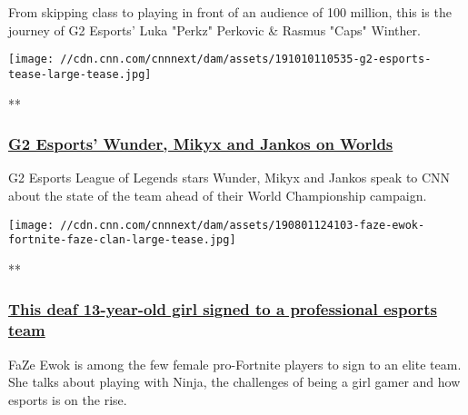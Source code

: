 From skipping class to playing in front of an audience of 100 million,
this is the journey of G2 Esports' Luka "Perkz" Perkovic \& Rasmus
"Caps" Winther.

\href{/videos/sports/2019/10/10/g2-esports-league-of-legends-world-championship-wunder-jankos-mikyx-preview-spt-intl-lon-orig.cnn}{}

\texttt{[image: //cdn.cnn.com/cnnnext/dam/assets/191010110535-g2-esports-tease-large-tease.jpg]}

**

\hypertarget{g2-esports-wunder-mikyx-and-jankos-on-worlds}{%
\subsubsection{\texorpdfstring{\href{/videos/sports/2019/10/10/g2-esports-league-of-legends-world-championship-wunder-jankos-mikyx-preview-spt-intl-lon-orig.cnn}{G2
Esports' Wunder, Mikyx and Jankos on
Worlds}}{G2 Esports' Wunder, Mikyx and Jankos on Worlds}}\label{g2-esports-wunder-mikyx-and-jankos-on-worlds}}

G2 Esports League of Legends stars Wunder, Mikyx and Jankos speak to CNN
about the state of the team ahead of their World Championship campaign.

\href{/videos/business/2019/08/01/fortnite-faze-ewok-interview-girl-gamer-orig.cnn-business}{}

\texttt{[image: //cdn.cnn.com/cnnnext/dam/assets/190801124103-faze-ewok-fortnite-faze-clan-large-tease.jpg]}

**

\hypertarget{this-deaf-13-year-old-girl-signed-to-a-professional-esports-team}{%
\subsubsection{\texorpdfstring{\href{/videos/business/2019/08/01/fortnite-faze-ewok-interview-girl-gamer-orig.cnn-business}{This
deaf 13-year-old girl signed to a professional esports
team}}{This deaf 13-year-old girl signed to a professional esports team}}\label{this-deaf-13-year-old-girl-signed-to-a-professional-esports-team}}

FaZe Ewok is among the few female pro-Fortnite players to sign to an
elite team. She talks about playing with Ninja, the challenges of being
a girl gamer and how esports is on the rise.

\href{/videos/business/2019/07/25/fortnite-teens-faze-dubs-megga-world-cup-millions.cnn-business}{}

